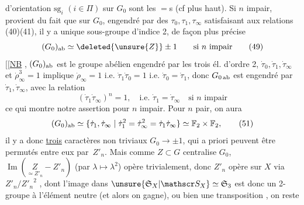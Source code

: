 d'orientation  $\mathrm{sg}_i$ $(i\in\Pi)$ sur $G_0$ sont les $=$s (cf plus haut). Si $n$ impair,  provient du fait que sur $G_0$, engendré par des  $\tau_0,\tau_1,\tau_\infty$ satisfaisant aux relations (40)(41), il y a  unique sous-groupe d'indice 2, de façon plus précise
\[
 (G_0)_{\rm ab}\simeq \deleted{\unsure{Z}}\pm1 \qquad\text{si }n\text{ impair}
 \tag*{(49)}
\]
$[\![$\uline{NB} , $(G_0)_{\rm ab}$ est  le groupe abélien engendré par les trois él. d'ordre 2, $\dot\tau_0,\dot\tau_1,\dot\tau_\infty$  et $\dot\rho_\infty^3=1$  implique $\dot\rho_\infty=1$ i.e. $\dot\tau_1\dot\tau_0=1$ i.e. $\dot\tau_0=\dot\tau_1$, donc $G_{0\,\rm ab}$ est engendré par $\dot\tau_1,\dot\tau_\infty$, avec la relation
\[
(\dot\tau_1\dot\tau_\infty)^n=1,\quad\text{i.e. }\dot\tau_1=\dot\tau_\infty\quad\text{si }n\text{ impair}
\tag*{(50)}
\]
ce qui montre notre assertion pour $n$ impair. Pour $n$ pair, on aura
\[
(G_0)_{\rm ab}\simeq\{\dot\tau_1,\dot\tau_\infty\mid\dot\tau_1^2=\dot\tau_\infty^2=\dot\tau_1\dot\tau_\infty\}\simeq\mathbb F_2\times\mathbb F_2,\tag*{(51)}
\]
il y a donc  \uline{trois} caractères  non triviaux $G_0\longrightarrow\pm1$, qui a priori peuvent être permutés entre eux par \,$Z'_n$. Mais comme $Z\subset G$ centralise $G_0$, $\operatorname{Im}(\underset{\simeq Z'_n}{Z}\mathrel{-}Z'_n)$ (par $\lambda\longmapsto\lambda^2$) opère trivialement, donc $Z'_n$ opère sur $X$ via
$Z'_n/{Z'_n}^2$ , dont l'image dans $\unsure{\mathfrak S_X|\mathscr S_X}\simeq\mathfrak S_3$ est donc un 2-groupe  à l'élément neutre (et alors on gagne), ou bien une transposition , on reste
